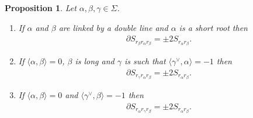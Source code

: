 \documentclass[10pt,a4paper]{amsart}
\numberwithin{equation}{section}
\newtheorem{Proposition}[Theorem]{Proposition}
 { \theoremstyle{definition}
\newtheorem{Definition}[Theorem]{Definition}
\newtheorem{Note}[Theorem]{Note}
\newtheorem{Example}[Theorem]{Example}
\newtheorem{Remark}[Theorem]{Remark} }
\begin{document}
\begin{Proposition}\label{pro.bound3bab}\label{pro.bound3ort}Let $\alpha,\beta,\gamma \in \Sigma $.
\begin{enumerate}\itemsep=0pt
\item[$1.$] If $\alpha$ and $\beta$ are linked by a double line and $\alpha$ is a short root then
\begin{gather*}
\partial S_{ r_{\beta }r_{\alpha }r_{\beta }} =\pm 2S_{ r_{\alpha }r_{\beta}}.
\end{gather*}
\item[$2.$] If $\langle\alpha,\beta\rangle=0$, $\beta$ is long and $\gamma$ is such that $ \langle \gamma^\vee,\alpha \rangle=-1$ then
\begin{gather*}
\partial S_{ r_{\gamma}r_{\alpha }r_{\beta }} =\pm 2S_{ r_{\alpha }r_{\beta}}.
\end{gather*}
\item[$3.$] If $\langle \alpha,\beta \rangle =0$ and $\langle \gamma ^{\vee},\beta \rangle =-1$ then
\begin{gather*}
\partial S_{ r_{\alpha }r_{\gamma }r_{\beta }} =\pm 2S_{ r_{\alpha }r_{\beta}}.
\end{gather*}
\end{enumerate}
\end{Proposition}
\end{document}
